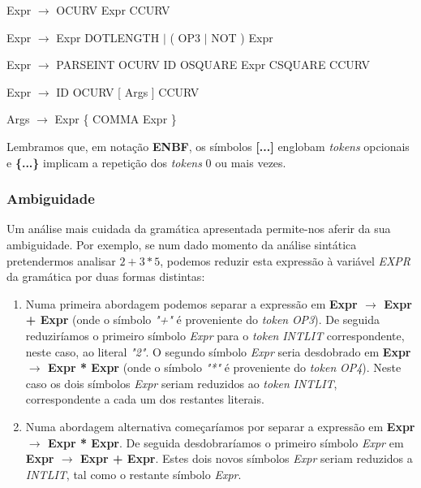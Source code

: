 \documentclass[11pt,a4paper]{article}
\begin{document}
\hspace{-1cm}Expr $\rightarrow$ OCURV Expr CCURV

\hspace{-1cm}Expr $\rightarrow$ Expr DOTLENGTH $\mid$ ( OP3 $\mid$ NOT ) Expr

\hspace{-1cm}Expr $\rightarrow$ PARSEINT OCURV ID OSQUARE Expr CSQUARE CCURV

\hspace{-1cm}Expr $\rightarrow$ ID OCURV [ Args ] CCURV

\hspace{-1cm}Args $\rightarrow$ Expr \{ COMMA Expr \}

\vspace{0.5cm}

Lembramos que, em notação \textbf{ENBF}, os símbolos \textbf{[...]} englobam \emph{tokens} opcionais e \textbf{\{...\}} implicam a repetição dos \emph{tokens} 0 ou mais vezes.

\subsubsection{Ambiguidade}

Um análise mais cuidada da gramática apresentada permite-nos aferir da sua ambiguidade. Por exemplo, se num dado momento da análise sintática pretendermos analisar $2+3*5$, podemos reduzir esta expressão à variável \emph{EXPR} da gramática por duas formas distintas:

\begin{enumerate}
\item Numa primeira abordagem podemos separar a expressão em \textbf{Expr $\rightarrow$ Expr + Expr} (onde o símbolo \emph{"+"} é proveniente do \emph{token} \emph{OP3}). De seguida reduziríamos o primeiro símbolo \emph{Expr} para o \emph{token} \emph{INTLIT} correspondente, neste caso, ao literal \emph{"2"}. O segundo símbolo \emph{Expr} seria desdobrado em \textbf{Expr $\rightarrow$ Expr * Expr} (onde o símbolo \emph{"*"} é proveniente do \emph{token} \emph{OP4}). Neste caso os dois símbolos \emph{Expr} seriam reduzidos ao \emph{token} \emph{INTLIT}, correspondente a cada um dos restantes literais.

\item Numa abordagem alternativa começaríamos por separar a expressão em \textbf{Expr $\rightarrow$ Expr * Expr}. De seguida desdobraríamos o primeiro símbolo \emph{Expr} em \textbf{Expr $\rightarrow$ Expr + Expr}. Estes dois novos símbolos \emph{Expr} seriam reduzidos a \emph{INTLIT}, tal como o restante símbolo \emph{Expr}.
\end{enumerate}
\end{document}
